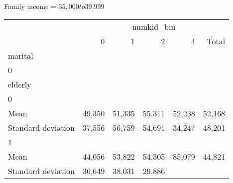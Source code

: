 Family income = $35,000 to $39,999
\begin{tabular}{llllll}
\cline{1-6}
\multicolumn{1}{c}{} &
  \multicolumn{5}{|c}{numkid\_bin} \\
\multicolumn{1}{c}{} &
  \multicolumn{1}{|r}{0} &
  \multicolumn{1}{r}{1} &
  \multicolumn{1}{r}{2} &
  \multicolumn{1}{r}{4} &
  \multicolumn{1}{r}{Total} \\
\cline{1-6}
\multicolumn{1}{l}{marital} &
  \multicolumn{1}{|r}{} &
  \multicolumn{1}{r}{} &
  \multicolumn{1}{r}{} &
  \multicolumn{1}{r}{} &
  \multicolumn{1}{r}{} \\
\multicolumn{1}{l}{\hspace{1em}0} &
  \multicolumn{1}{|r}{} &
  \multicolumn{1}{r}{} &
  \multicolumn{1}{r}{} &
  \multicolumn{1}{r}{} &
  \multicolumn{1}{r}{} \\
\multicolumn{1}{l}{\hspace{2em}elderly} &
  \multicolumn{1}{|r}{} &
  \multicolumn{1}{r}{} &
  \multicolumn{1}{r}{} &
  \multicolumn{1}{r}{} &
  \multicolumn{1}{r}{} \\
\multicolumn{1}{l}{\hspace{3em}0} &
  \multicolumn{1}{|r}{} &
  \multicolumn{1}{r}{} &
  \multicolumn{1}{r}{} &
  \multicolumn{1}{r}{} &
  \multicolumn{1}{r}{} \\
\multicolumn{1}{l}{\hspace{4em}Mean} &
  \multicolumn{1}{|r}{49,350} &
  \multicolumn{1}{r}{51,335} &
  \multicolumn{1}{r}{55,311} &
  \multicolumn{1}{r}{52,238} &
  \multicolumn{1}{r}{52,168} \\
\multicolumn{1}{l}{\hspace{4em}Standard deviation} &
  \multicolumn{1}{|r}{37,556} &
  \multicolumn{1}{r}{56,759} &
  \multicolumn{1}{r}{54,691} &
  \multicolumn{1}{r}{34,247} &
  \multicolumn{1}{r}{48,201} \\
\multicolumn{1}{l}{\hspace{3em}1} &
  \multicolumn{1}{|r}{} &
  \multicolumn{1}{r}{} &
  \multicolumn{1}{r}{} &
  \multicolumn{1}{r}{} &
  \multicolumn{1}{r}{} \\
\multicolumn{1}{l}{\hspace{4em}Mean} &
  \multicolumn{1}{|r}{44,056} &
  \multicolumn{1}{r}{53,822} &
  \multicolumn{1}{r}{54,305} &
  \multicolumn{1}{r}{85,079} &
  \multicolumn{1}{r}{44,821} \\
\multicolumn{1}{l}{\hspace{4em}Standard deviation} &
  \multicolumn{1}{|r}{36,649} &
  \multicolumn{1}{r}{38,031} &
  \multicolumn{1}{r}{29,886} &

\end{tabular}
